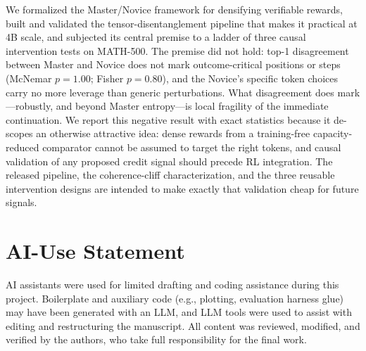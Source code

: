 \documentclass[times, 10pt,twocolumn]{article}
\begin{document}
We formalized the Master/Novice framework for densifying verifiable rewards,
built and validated the tensor-disentanglement pipeline that makes it
practical at 4B scale, and subjected its central premise to a ladder of three
causal intervention tests on MATH-500. The premise did not hold: top-1
disagreement between Master and Novice does not mark outcome-critical
positions or steps (McNemar $p{=}1.00$; Fisher $p{=}0.80$), and the Novice's
specific token choices carry no more leverage than generic perturbations. What
disagreement does mark---robustly, and beyond Master entropy---is local
fragility of the immediate continuation. We report this negative result with
exact statistics because it de-scopes an otherwise attractive idea: dense
rewards from a training-free capacity-reduced comparator cannot be assumed to
target the right tokens, and causal validation of any proposed credit signal
should precede RL integration. The released pipeline, the coherence-cliff
characterization, and the three reusable intervention designs are intended to
make exactly that validation cheap for future signals.


\section*{AI-Use Statement}

AI assistants were used for limited drafting and coding assistance during this
project. Boilerplate and auxiliary code (e.g., plotting, evaluation harness
glue) may have been generated with an LLM, and LLM tools were used to assist
with editing and restructuring the manuscript. All content was reviewed,
modified, and verified by the authors, who take full responsibility for the
final work.



\end{document}
